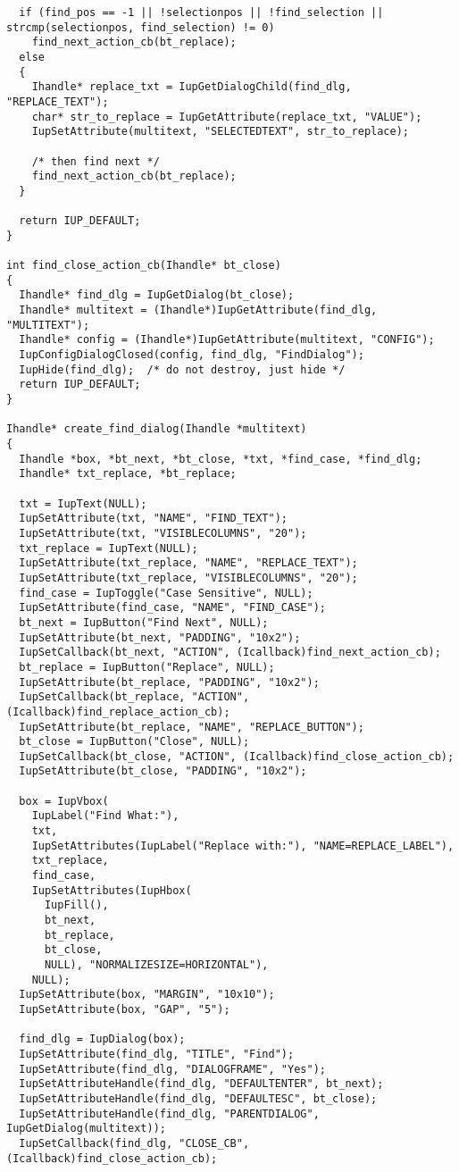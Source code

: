 \documentclass{ctexart}
\begin{document}
\begin{lstlisting}
  if (find_pos == -1 || !selectionpos || !find_selection || strcmp(selectionpos, find_selection) != 0)
    find_next_action_cb(bt_replace);
  else
  {
    Ihandle* replace_txt = IupGetDialogChild(find_dlg, "REPLACE_TEXT");
    char* str_to_replace = IupGetAttribute(replace_txt, "VALUE");
    IupSetAttribute(multitext, "SELECTEDTEXT", str_to_replace);

    /* then find next */
    find_next_action_cb(bt_replace);
  }

  return IUP_DEFAULT;
}

int find_close_action_cb(Ihandle* bt_close)
{
  Ihandle* find_dlg = IupGetDialog(bt_close);
  Ihandle* multitext = (Ihandle*)IupGetAttribute(find_dlg, "MULTITEXT");
  Ihandle* config = (Ihandle*)IupGetAttribute(multitext, "CONFIG");
  IupConfigDialogClosed(config, find_dlg, "FindDialog");
  IupHide(find_dlg);  /* do not destroy, just hide */
  return IUP_DEFAULT;
}

Ihandle* create_find_dialog(Ihandle *multitext)
{
  Ihandle *box, *bt_next, *bt_close, *txt, *find_case, *find_dlg;
  Ihandle* txt_replace, *bt_replace;

  txt = IupText(NULL);
  IupSetAttribute(txt, "NAME", "FIND_TEXT");
  IupSetAttribute(txt, "VISIBLECOLUMNS", "20");
  txt_replace = IupText(NULL);
  IupSetAttribute(txt_replace, "NAME", "REPLACE_TEXT");
  IupSetAttribute(txt_replace, "VISIBLECOLUMNS", "20");
  find_case = IupToggle("Case Sensitive", NULL);
  IupSetAttribute(find_case, "NAME", "FIND_CASE");
  bt_next = IupButton("Find Next", NULL);
  IupSetAttribute(bt_next, "PADDING", "10x2");
  IupSetCallback(bt_next, "ACTION", (Icallback)find_next_action_cb);
  bt_replace = IupButton("Replace", NULL);
  IupSetAttribute(bt_replace, "PADDING", "10x2");
  IupSetCallback(bt_replace, "ACTION", (Icallback)find_replace_action_cb);
  IupSetAttribute(bt_replace, "NAME", "REPLACE_BUTTON");
  bt_close = IupButton("Close", NULL);
  IupSetCallback(bt_close, "ACTION", (Icallback)find_close_action_cb);
  IupSetAttribute(bt_close, "PADDING", "10x2");

  box = IupVbox(
    IupLabel("Find What:"),
    txt,
    IupSetAttributes(IupLabel("Replace with:"), "NAME=REPLACE_LABEL"),
    txt_replace,
    find_case,
    IupSetAttributes(IupHbox(
      IupFill(),
      bt_next,
      bt_replace,
      bt_close,
      NULL), "NORMALIZESIZE=HORIZONTAL"),
    NULL);
  IupSetAttribute(box, "MARGIN", "10x10");
  IupSetAttribute(box, "GAP", "5");

  find_dlg = IupDialog(box);
  IupSetAttribute(find_dlg, "TITLE", "Find");
  IupSetAttribute(find_dlg, "DIALOGFRAME", "Yes");
  IupSetAttributeHandle(find_dlg, "DEFAULTENTER", bt_next);
  IupSetAttributeHandle(find_dlg, "DEFAULTESC", bt_close);
  IupSetAttributeHandle(find_dlg, "PARENTDIALOG", IupGetDialog(multitext));
  IupSetCallback(find_dlg, "CLOSE_CB", (Icallback)find_close_action_cb);


\end{lstlisting}
\end{document}
